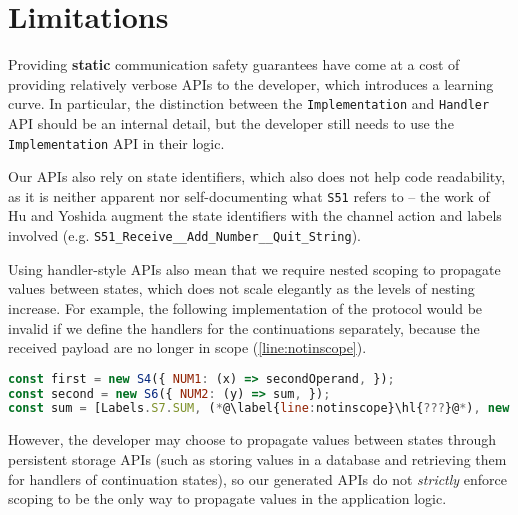 \section{Limitations}
\label{section:nodelimitations}

Providing \textbf{static} communication safety guarantees have
come at a cost of providing relatively verbose APIs to the developer,
which introduces a learning curve. In particular,
the distinction between the \texttt{Implementation} and
\texttt{Handler} API should be an internal detail, but
the developer still needs to use the \texttt{Implementation} API
in their logic. 

Our APIs also rely on state identifiers, which also
does not help code readability, as it is neither apparent nor
self-documenting what \texttt{S51} refers to -- the work of
Hu and Yoshida
\cite{Hybrid2016} augment
the state identifiers with the channel
action and labels involved (e.g. 
\texttt{S51_Receive__Add_Number__Quit_String}).

Using handler-style APIs also mean that we require
nested scoping to propagate values between states,
which does not scale elegantly as the levels of nesting
increase. 
For example, the following implementation of
the  protocol would be invalid if
we define the handlers for the continuations separately,
because the received payload are no longer in scope
(\cref{line:notinscope}).

\begin{lstlisting}[language=javascript]
const first = new S4({ NUM1: (x) => secondOperand, });
const second = new S6({ NUM2: (y) => sum, });
const sum = [Labels.S7.SUM, (*@\label{line:notinscope}\hl{???}@*), new S5()];
\end{lstlisting}

However, the developer may choose to propagate values
between states through persistent storage APIs (such as
storing values in a database and retrieving them for
handlers of continuation states), 
so our generated APIs
do not \textit{strictly} enforce scoping to be the only way to
propagate values in the application logic.
